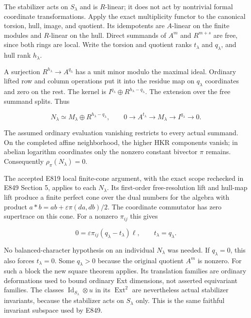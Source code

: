 The stabilizer acts on \(S_{\lambda}\) and is \(R\)-linear; it does not act by
nontrivial formal coordinate transformations. Apply the exact
multiplicity functor to the canonical torsion, hull, image, and
quotient. Its idempotents are \(A\)-linear on the finite modules and
\(R\)-linear on the hull. Direct summands of \(A^m\) and \(R^{m+s}\) are free,
since both rings are local. Write the torsion and quotient ranks
\(t_{\lambda}\) and \(q_{\lambda}\), and hull rank \(h_{\lambda}\).

A surjection \(R^{h_{\lambda}}\to A^{q_{\lambda}}\) has a unit minor modulo the
maximal ideal. Ordinary lifted row and column operations put it into
the residue map on \(q_{\lambda}\) coordinates and zero on the rest.
The kernel is \(I^{q_{\lambda}}\oplus R^{h_{\lambda}-q_{\lambda}}\). The extension over
the free summand splits. Thus

\[
 N_\lambda\simeq M_\lambda\oplus R^{h_\lambda-q_\lambda},\qquad
 0\longrightarrow A^{t_\lambda}\longrightarrow M_\lambda
                 \longrightarrow I^{q_\lambda}\longrightarrow0.
 \tag{TR.20}
\]

The assumed ordinary evaluation vanishing restricts to every actual
summand. On the completed affine neighborhood, the higher HKR
components vanish; in abelian logarithm coordinates only the nonzero
constant bivector \(\pi\) remains. Consequently \(\rho_{\pi}(N_{\lambda})=0\).

The accepted E819 local finite-cone argument, with the exact scope
rechecked in E849 Section 5, applies to each \(N_{\lambda}\). Its first-order
free-resolution lift and hull-map lift produce a finite perfect cone
over the dual numbers for the algebra with product
\(a*b=ab+\varepsilon\pi(da,db)/2\). The coordinate commutator has zero
supertrace on this cone. For a nonzero \(\pi_{ij}\) this gives

\[
            0=\varepsilon\pi_{ij}(q_\lambda-t_\lambda)\ell,
            \qquad t_\lambda=q_\lambda.
 \tag{TR.21}
\]

No balanced-character hypothesis on an individual \(N_{\lambda}\) was needed.
If \(q_{\lambda}=0\), this also forces \(t_{\lambda}=0\). Some \(q_{\lambda}>0\) because
the original quotient \(A^m\) is nonzero. For such a block the new square
theorem applies. Its translation families are ordinary deformations
used to bound ordinary Ext dimensions, not asserted equivariant
families. The classes \(\operatorname{Id}_{S_\lambda}\otimes u\) in its \(\operatorname{Ext}^2\) are nevertheless
actual stabilizer invariants, because the stabilizer acts on \(S_{\lambda}\)
only. This is the same faithful invariant subspace used by E849.


